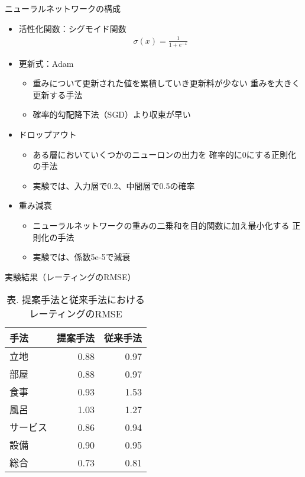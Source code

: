 \documentclass[unicode,10pt]{beamer}
\begin{document}
\begin{frame}{ニューラルネットワークの構成}{}
  \begin{itemize}
    \Large %
    \item 活性化関数：シグモイド関数
      \Large %
      \begin{gather*}
        \sigma(x) = \frac{1}{1 + e^{-x}}
      \end{gather*}
    \item 更新式：Adam
      \begin{itemize}
        \Large %
        \item 重みについて更新された値を累積していき更新料が少ない
              重みを大きく更新する手法
        \item 確率的勾配降下法（SGD）より収束が早い
      \end{itemize}
    \item ドロップアウト
      \begin{itemize}
        \Large %
        \item ある層においていくつかのニューロンの出力を
              確率的に0にする正則化の手法
        \item 実験では、入力層で0.2、中間層で0.5の確率
      \end{itemize}
    \item 重み減衰
      \begin{itemize}
        \Large %
        \item ニューラルネットワークの重みの二乗和を目的関数に加え最小化する
              正則化の手法
        \item 実験では、係数5e-5で減衰
      \end{itemize}
  \end{itemize}
\end{frame}

\begin{frame}{実験結果（レーティングのRMSE）}{}
  \begin{table}
    \caption{\large %
             表. 提案手法と従来手法におけるレーティングのRMSE}
    \centering
    \begin{tabular}{l | r r}
      手法 & 提案手法 & 従来手法 \\
      \hline
      立地      & 0.88 & 0.97 \\
      部屋      & 0.88 & 0.97 \\
      食事      & 0.93 & 1.53 \\
      風呂      & 1.03 & 1.27 \\
      サービス  & 0.86 & 0.94 \\
      設備      & 0.90 & 0.95 \\
      総合      & 0.73 & 0.81 \\
    \end{tabular}
  \end{table}
\end{frame}
\end{document}
